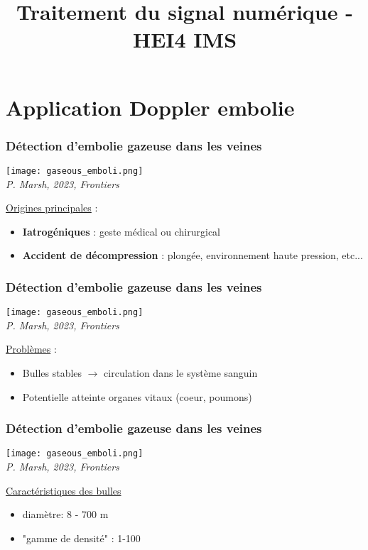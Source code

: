 \documentclass{beamer}
\title[Traitement du signal numérique]{Traitement du signal numérique - HEI4 IMS}
\author[Antony Bazir]{}
\begin{document}
\section{Application Doppler embolie}
\begin{frame} 
\frametitle{Détection d'embolie gazeuse dans les veines}
\begin{center}
\texttt{[image: gaseous\_emboli.png]}\\
\textit{\footnotesize P. Marsh, 2023, Frontiers}
\end{center}
\underline{Origines principales} : 
\begin{itemize}
\item \textbf{Iatrogéniques} : geste médical ou chirurgical 
\item \textbf{Accident de décompression} : plongée, environnement haute pression, etc...
\end{itemize}
\end{frame} 

\begin{frame} 
\frametitle{Détection d'embolie gazeuse dans les veines}
\begin{center}
\texttt{[image: gaseous\_emboli.png]}\\
\textit{\footnotesize P. Marsh, 2023, Frontiers}
\end{center}
\underline{Problèmes} : 
\begin{itemize}
\item Bulles stables $\rightarrow$ circulation dans le système sanguin
\item Potentielle atteinte organes vitaux (coeur, poumons)
\end{itemize}
\end{frame} 

\begin{frame} 
\frametitle{Détection d'embolie gazeuse dans les veines}
\begin{center}
\texttt{[image: gaseous\_emboli.png]}\\
\textit{\footnotesize P. Marsh, 2023, Frontiers}
\end{center}
\underline{Caractéristiques des bulles}
\begin{itemize}
\item diamètre: 8 - 700 \textmu m
\item "gamme de densité" :  1-100
\end{itemize}
\end{frame}
\end{document}
